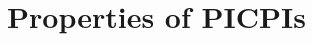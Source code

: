 \documentclass[11pt]{article}
\theoremstyle{statplain}
\theoremstyle{statdefinition}
\newtheorem{definition}[theorem]{Definition}
\newtheorem{remark}[theorem]{Remark}
\newcommand{\0}{\mathbf{0}}
\newcommand{\titleShorts}{PICPIs\xspace}
\begin{document}





\clearpage
\section{Properties of \titleShorts}
\label{sec:properties}
\end{document}
